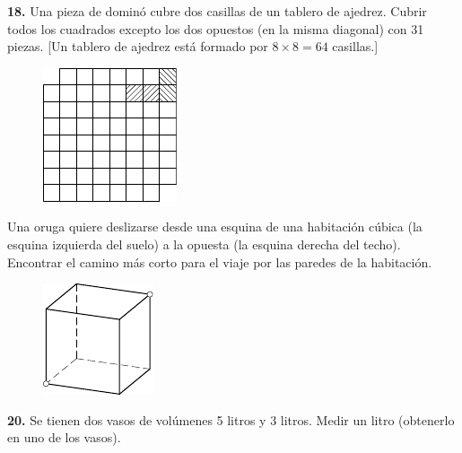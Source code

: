 \documentclass[12pt, spanish]{article}  %
\begin{document}
\medskip\noindent
{\bf 18.} Una pieza de domin\'o cubre dos casillas de un tablero de ajedrez. 
Cubrir todos los cuadrados excepto los dos opuestos (en la misma diagonal) con 31 piezas. [Un tablero de ajedrez est\'a formado por $8 \times 8 = 64$ casillas.]
\begin{figure}[h]
\centering
\footnotesize
\includegraphics[scale=1]{taskbook-2}
\end{figure}

 Una oruga quiere deslizarse desde una esquina de una habitaci\'on c\'ubica (la esquina izquierda del suelo) a la opuesta (la esquina derecha del techo).
Encontrar el camino m\'as corto para el viaje por las paredes de la habitaci\'on.
\begin{figure}[h]
\centering
\footnotesize
\includegraphics[scale=1]{taskbook-3}
\end{figure}
\newline\newline\quad
{\bf 20.} Se tienen dos vasos de vol\'umenes 5 litros y 3 litros. Medir un litro (obtenerlo en uno de los vasos).
\end{document}
